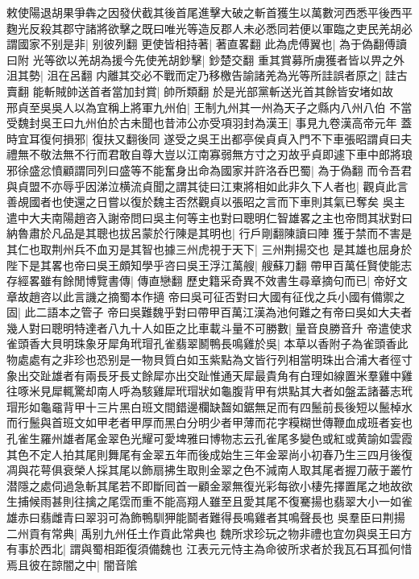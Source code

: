 敕使陽退胡果爭犇之因發伏截其後首尾進擊大破之斬首獲生以萬數河西悉平後西平麴光反殺其郡守諸將欲擊之既曰唯光等造反郡人未必悉同若便以軍臨之吏民羌胡必謂國家不别是非|{
	别彼列翻}
更使皆相持著|{
	著直畧翻}
此為虎傅翼也|{
	為于偽翻傅讀曰附}
光等欲以羌胡為援今先使羌胡鈔擊|{
	鈔楚交翻}
重其賞募所虜獲者皆以畀之外沮其勢|{
	沮在呂翻}
内離其交必不戰而定乃移檄告諭諸羌為光等所詿誤者原之|{
	詿古賣翻}
能斬賊帥送首者當加封賞|{
	帥所類翻}
於是光部黨斬送光首其餘皆安堵如故　邢貞至吳吳人以為宜稱上將軍九州伯|{
	王制九州其一州為天子之縣内八州八伯}
不當受魏封吳王曰九州伯於古未聞也昔沛公亦受項羽封為漢王|{
	事見九卷漢高帝元年}
蓋時宜耳復何損邪|{
	復扶又翻後同}
遂受之吳王出都亭侯貞貞入門不下車張昭謂貞曰夫禮無不敬法無不行而君敢自尊大豈以江南寡弱無方寸之刃故乎貞即遽下車中郎將琅邪徐盛忿憤顧謂同列曰盛等不能奮身出命為國家并許洛呑巴蜀|{
	為于偽翻}
而令吾君與貞盟不亦辱乎因涕泣横流貞聞之謂其徒曰江東將相如此非久下人者也|{
	觀貞此言善覘國者也使還之日嘗以復於魏主否然觀貞以張昭之言而下車則其氣已奪矣}
吳主遣中大夫南陽趙咨入謝帝問曰吳主何等主也對曰聰明仁智雄畧之主也帝問其狀對曰納魯肅於凡品是其聰也拔呂蒙於行陳是其明也|{
	行戶剛翻陳讀曰陣}
獲于禁而不害是其仁也取荆州兵不血刃是其智也據三州虎視于天下|{
	三州荆揚交也}
是其雄也屈身於陛下是其畧也帝曰吳王頗知學乎咨曰吳王浮江萬艘|{
	艘蘇刀翻}
帶甲百萬任賢使能志存經畧雖有餘閒博覽書傳|{
	傳直戀翻}
歷史籍采奇異不效書生尋章摘句而已|{
	帝好文章故趙咨以此言譏之摘蜀本作擿}
帝曰吳可征否對曰大國有征伐之兵小國有備禦之固|{
	此二語本之管子}
帝曰吳難魏乎對曰帶甲百萬江漢為池何難之有帝曰吳如大夫者幾人對曰聰明特達者八九十人如臣之比車載斗量不可勝數|{
	量音良勝音升}
帝遣使求雀頭香大貝明珠象牙犀角玳瑁孔雀翡翠鬭鴨長鳴雞於吳|{
	本草以香附子為雀頭香此物處處有之非珍也恐别是一物貝質白如玉紫點為文皆行列相當明珠出合浦大者徑寸象出交趾雄者有兩長牙長丈餘犀亦出交趾惟通天犀最貴角有白理如線置米羣雞中雞往啄米見犀輒驚却南人呼為駭雞犀玳瑁狀如龜腹背甲有烘點其大者如盤盂諸蕃志玳瑁形如龜黿背甲十三片黑白班文間錯邊欄缺齧如鋸無足而有四鬛前長後短以鬛棹水而行鬛與首班文如甲老者甲厚而黑白分明少者甲薄而花字糢糊世傳鞭血成班者妄也孔雀生羅州雄者尾金翠色光耀可愛埤雅曰博物志云孔雀尾多變色或紅或黄諭如雲霞其色不定人拍其尾則舞尾有金翠五年而後成始生三年金翠尚小初春乃生三四月後復凋與花萼俱衰榮人採其尾以飾扇拂生取則金翠之色不減南人取其尾者握刀蔽于叢竹潜隱之處伺過急斬其尾若不即斷囘首一顧金翠無復光彩每欲小棲先擇置尾之地故欲生捕候雨甚則往擒之尾霑而重不能高翔人雖至且愛其尾不復騫揚也翡翠大小一如雀雄赤曰翡雌青曰翠羽可為飾鴨馴狎能鬬者難得長鳴雞者其鳴聲長也}
吳羣臣曰荆揚二州貢有常典|{
	禹别九州任土作貢此常典也}
魏所求珍玩之物非禮也宜勿與吳王曰方有事於西北|{
	謂與蜀相距復須備魏也}
江表元元恃主為命彼所求者於我瓦石耳孤何惜焉且彼在諒闇之中|{
	闇音隂}

